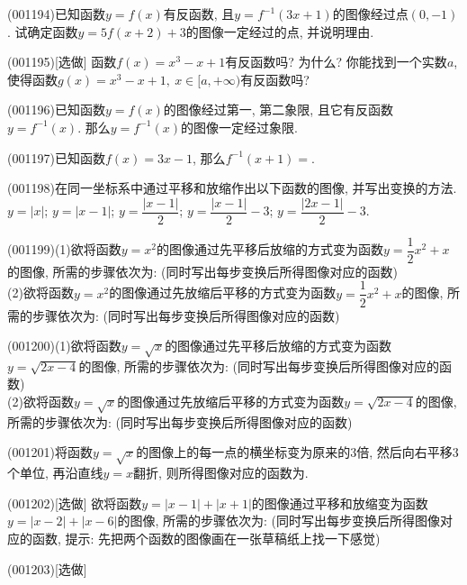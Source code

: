 \item (001194)已知函数$y=f(x)$有反函数, 且$y=f^{-1}(3x+1)$的图像经过点$(0,-1)$. 试确定函数$y=5f(x+2)+3$的图像一定经过的点, 并说明理由.
\item (001195)[选做]
函数$f(x)=x^3-x+1$有反函数吗? 为什么? 你能找到一个实数$a$, 使得函数$g(x)=x^3-x+1, \ x \in [a,+\infty)$有反函数吗?
\item (001196)已知函数$y=f(x)$的图像经过第一, 第二象限, 且它有反函数$y=f^{-1}(x)$. 那么$y=f^{-1}(x)$的图像一定经过象限.
\item (001197)已知函数$f(x)=3x-1$, 那么$f^{-1}(x+1)=$.
\item (001198)在同一坐标系中通过平移和放缩作出以下函数的图像, 并写出变换的方法.
$y=|x|$; $y=|x-1|$; $y=\dfrac{|x-1|}2$; $y=\dfrac{|x-1|}2-3$; $y=\dfrac{|2x-1|}2-3$.
\begin{center}
\end{center}
\item (001199)(1)欲将函数$y=x^2$的图像通过先平移后放缩的方式变为函数$y=\dfrac{1}{2}x^2+x$的图像, 所需的步骤依次为: (同时写出每步变换后所得图像对应的函数)\\ 
(2)欲将函数$y=x^2$的图像通过先放缩后平移的方式变为函数$y=\dfrac{1}{2}x^2+x$的图像, 所需的步骤依次为: (同时写出每步变换后所得图像对应的函数)
\item (001200)(1)欲将函数$y=\sqrt{x}$的图像通过先平移后放缩的方式变为函数$y=\sqrt{2x-4}$的图像, 所需的步骤依次为: (同时写出每步变换后所得图像对应的函数)\\ 
(2)欲将函数$y=\sqrt{x}$的图像通过先放缩后平移的方式变为函数$y=\sqrt{2x-4}$的图像, 所需的步骤依次为: (同时写出每步变换后所得图像对应的函数)
\item (001201)将函数$y=\sqrt{x}$的图像上的每一点的横坐标变为原来的$3$倍, 然后向右平移$3$个单位, 再沿直线$y=x$翻折, 则所得图像对应的函数为.
\item (001202)[选做]
欲将函数$y=|x-1|+|x+1|$的图像通过平移和放缩变为函数$y=|x-2|+|x-6|$的图像, 所需的步骤依次为: (同时写出每步变换后所得图像对应的函数, 提示: 先把两个函数的图像画在一张草稿纸上找一下感觉)
\item (001203)[选做]
